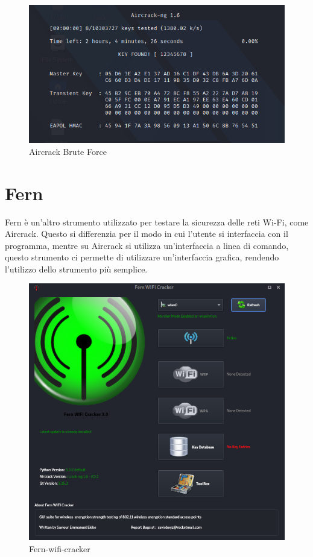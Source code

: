\begin{figure}[ht]
    \centering
    \includegraphics[width=\linewidth]{Immagini/6/ircrack_6.png}
    \caption{Aircrack Brute Force}
    \label{fig:Aircrack example}
\end{figure}

\newpage

\section{Fern}

Fern\cite{fern} è un'altro strumento utilizzato per testare la sicurezza delle reti Wi-Fi, come Aircrack. Questo si differenzia per il modo in cui l'utente si interfaccia con il programma, mentre su Aircrack si utilizza un'interfaccia a linea di comando, questo strumento ci permette di utilizzare un'interfaccia grafica, rendendo l'utilizzo dello strumento più semplice.

\begin{figure}[ht]
    \centering
    \includegraphics[width=\linewidth]{Immagini/6/fern_1.png}
    \caption{Fern-wifi-cracker}
    \label{fig:Fern example}
\end{figure}

